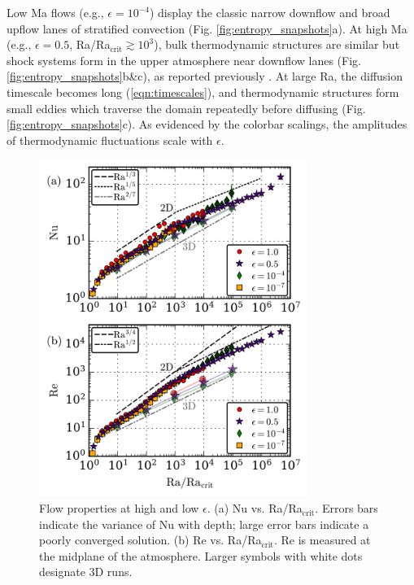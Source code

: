 \documentclass[aps, prl, twocolumn, nofootinbib, groupedaddress, amsfonts, amssymb, amsmath]{revtex4-1}
\begin{document}
Low Ma flows (e.g., $\epsilon = 10^{-4}$)
display the classic narrow downflow and broad upflow lanes of stratified
convection (Fig. \ref{fig:entropy_snapshots}a).
At high Ma (e.g., $\epsilon = 0.5$, Ra/Ra$_{\text{crit}} \gtrsim 10^3$), 
bulk thermodynamic structures are similar but
shock systems form in the upper atmosphere near downflow lanes 
(Fig. \ref{fig:entropy_snapshots}b\&c), as reported previously
\cite{cattaneo&all1990, malagoli&all1990}.
At large Ra, the diffusion timescale becomes long (\ref{eqn:timescales}), 
and
thermodynamic structures form small eddies which traverse the
domain repeatedly before diffusing (Fig. \ref{fig:entropy_snapshots}c).
As evidenced by the colorbar scalings, the
amplitudes of thermodynamic fluctuations scale with $\epsilon$.

\begin{figure}[t]
\includegraphics[width=3.4375in]{./figs/re_and_nu_v_Ra.png}
\caption{
Flow properties at high and low $\epsilon$. 
(a) Nu vs. Ra/Ra$_{\text{crit}}$.
Errors bars indicate the variance of Nu with depth;
large error bars indicate a poorly converged solution.
(b) Re vs. Ra/Ra$_{\text{crit}}$.
Re is measured at the midplane of the atmosphere.
Larger symbols with white dots designate 3D runs.
 \label{fig:re_and_nu_v_ra}
}
\end{figure}
\end{document}
